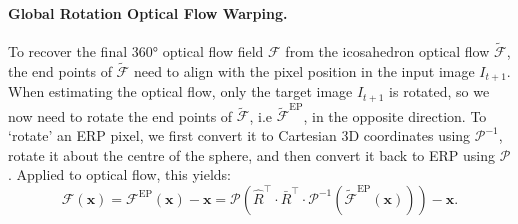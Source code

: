 \vspace{-1em}
\paragraph{Global Rotation Optical Flow Warping.}
To recover the final 360° optical flow field $\mathcal{F}$ from the icosahedron optical flow $\tilde{\mathcal{F}}$, the end points of $\tilde{\mathcal{F}}$ need to align with the pixel position in the input image $I_{t+1}$.
When estimating the optical flow, only the target image $I_{t+1}$ is rotated, so we now need to rotate the end points of $\tilde{\mathcal{F}}$, i.e $\tilde{\mathcal{F}}^\text{EP}$, in the opposite direction.
To `rotate' an ERP pixel, we first convert it to Cartesian 3D coordinates using  $\mathcal{P}^{-1}$, rotate it about the centre of the sphere, and then convert it back to ERP  using $\mathcal{P}$.
Applied to optical flow, this yields:
\begin{equation}\label{equ:approach:globalwarp}
	\mathcal{F}(\mathbf{x})
	= \mathcal{F}^\text{EP}(\mathbf{x}) - \mathbf{x}
	= \mathcal{P} \left( \hat{R}^\top \cdot \bar{R}^\top \cdot \mathcal{P}^{-1}(\tilde{\mathcal{F}}^\text{EP}(\mathbf{x}))\right)  - \mathbf{x}
	\text{.}
\end{equation}
